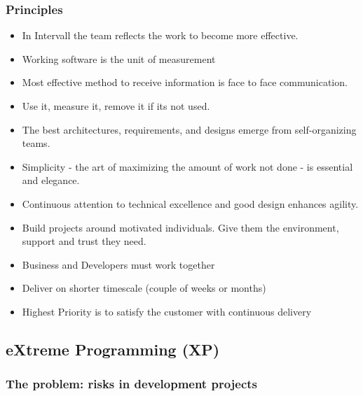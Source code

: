 \subsubsection{Principles}
\begin{itemize}
    \item In Intervall the team reflects the work to become more effective.
    \item Working software is the unit of measurement
    \item Most effective method to receive information is face to face communication.
    \item Use it, measure it, remove it if its not used.
    \item The best architectures, requirements, and designs emerge from self-organizing teams.
    \item Simplicity - the art of maximizing the amount of work not done - is essential and elegance.
    \item Continuous attention to technical excellence and good design enhances agility.
    \item Build projects around motivated individuals. Give them the environment, support and trust they need.
\item Business and Developers must work together
\item Deliver on shorter timescale (couple of weeks or months)
\item Highest Priority is to satisfy the customer with continuous delivery
\end{itemize}















\hypertarget{extreme-programming-xp}{%
\subsection{eXtreme Programming (XP)}\label{extreme-programming-xp}}

\hypertarget{the-problem-risks-in-development-projects}{%
\subsubsection{The problem: risks in development
projects}\label{the-problem-risks-in-development-projects}}


